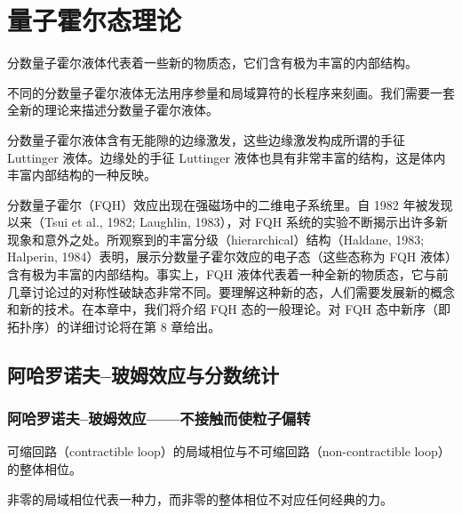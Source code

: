 
\chapter{量子霍尔态理论}

\begin{keypoints}
\item 分数量子霍尔液体代表着一些新的物质态，它们含有极为丰富的内部结构。
\item 不同的分数量子霍尔液体无法用序参量和局域算符的长程序来刻画。我们需要一套全新的理论来描述分数量子霍尔液体。
\item 分数量子霍尔液体含有无能隙的边缘激发，这些边缘激发构成所谓的手征 Luttinger 液体。边缘处的手征 Luttinger 液体也具有非常丰富的结构，这是体内丰富内部结构的一种反映。
\end{keypoints}

分数量子霍尔（FQH）效应出现在强磁场中的二维电子系统里。自 1982 年被发现以来（Tsui et al., 1982; Laughlin, 1983），对 FQH 系统的实验不断揭示出许多新现象和意外之处。所观察到的丰富分级（hierarchical）结构（Haldane, 1983; Halperin, 1984）表明，展示分数量子霍尔效应的电子态（这些态称为 FQH 液体）含有极为丰富的内部结构。事实上，FQH 液体代表着一种全新的物质态，它与前几章讨论过的对称性破缺态非常不同。要理解这种新的态，人们需要发展新的概念和新的技术。在本章中，我们将介绍 FQH 态的一般理论。对 FQH 态中新序（即拓扑序）的详细讨论将在第 8 章给出。

\section{阿哈罗诺夫--玻姆效应与分数统计}

\subsection{阿哈罗诺夫--玻姆效应——不接触而使粒子偏转}

\begin{keypoints}
\item 可缩回路（contractible loop）的局域相位与不可缩回路（non-contractible loop）的整体相位。
\item 非零的局域相位代表一种力，而非零的整体相位不对应任何经典的力。
\end{keypoints}


